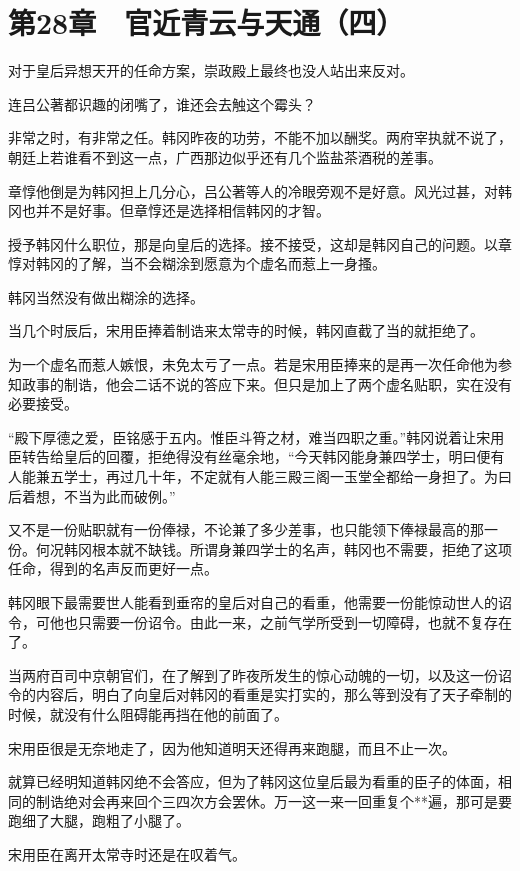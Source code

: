 \section{第28章　官近青云与天通（四）}

对于皇后异想天开的任命方案，崇政殿上最终也没人站出来反对。

连吕公著都识趣的闭嘴了，谁还会去触这个霉头？

非常之时，有非常之任。韩冈昨夜的功劳，不能不加以酬奖。两府宰执就不说了，朝廷上若谁看不到这一点，广西那边似乎还有几个监盐茶酒税的差事。

章惇他倒是为韩冈担上几分心，吕公著等人的冷眼旁观不是好意。风光过甚，对韩冈也并不是好事。但章惇还是选择相信韩冈的才智。

授予韩冈什么职位，那是向皇后的选择。接不接受，这却是韩冈自己的问题。以章惇对韩冈的了解，当不会糊涂到愿意为个虚名而惹上一身搔。

韩冈当然没有做出糊涂的选择。

当几个时辰后，宋用臣捧着制诰来太常寺的时候，韩冈直截了当的就拒绝了。

为一个虚名而惹人嫉恨，未免太亏了一点。若是宋用臣捧来的是再一次任命他为参知政事的制诰，他会二话不说的答应下来。但只是加上了两个虚名贴职，实在没有必要接受。

“殿下厚德之爱，臣铭感于五内。惟臣斗筲之材，难当四职之重。”韩冈说着让宋用臣转告给皇后的回覆，拒绝得没有丝毫余地，“今天韩冈能身兼四学士，明曰便有人能兼五学士，再过几十年，不定就有人能三殿三阁一玉堂全都给一身担了。为曰后着想，不当为此而破例。”

又不是一份贴职就有一份俸禄，不论兼了多少差事，也只能领下俸禄最高的那一份。何况韩冈根本就不缺钱。所谓身兼四学士的名声，韩冈也不需要，拒绝了这项任命，得到的名声反而更好一点。

韩冈眼下最需要世人能看到垂帘的皇后对自己的看重，他需要一份能惊动世人的诏令，可他也只需要一份诏令。由此一来，之前气学所受到一切障碍，也就不复存在了。

当两府百司中京朝官们，在了解到了昨夜所发生的惊心动魄的一切，以及这一份诏令的内容后，明白了向皇后对韩冈的看重是实打实的，那么等到没有了天子牵制的时候，就没有什么阻碍能再挡在他的前面了。

宋用臣很是无奈地走了，因为他知道明天还得再来跑腿，而且不止一次。

就算已经明知道韩冈绝不会答应，但为了韩冈这位皇后最为看重的臣子的体面，相同的制诰绝对会再来回个三四次方会罢休。万一这一来一回重复个**遍，那可是要跑细了大腿，跑粗了小腿了。

宋用臣在离开太常寺时还是在叹着气。

